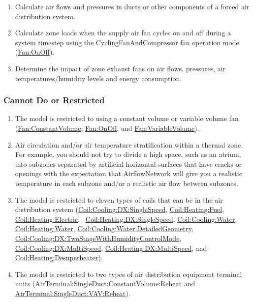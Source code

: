 \begin{enumerate}
\item Calculate air flows and pressures in ducts or other components of a forced air distribution system.
\item Calculate zone loads when the supply air fan cycles on and off during a system timestep using the CyclingFanAndCompressor fan operation mode (\hyperref[fanonoff]{Fan:OnOff}).
\item Determine the impact of zone exhaust fans on air flows, pressures, air temperatures/humidity levels and energy consumption.
\end{enumerate}

\subsubsection{Cannot Do or Restricted}\label{cannot-do-or-restricted}
\begin{enumerate}
\item The model is restricted to using a constant volume or variable volume fan (\hyperref[fanconstantvolume]{Fan:ConstantVolume}, \hyperref[fanonoff]{Fan:OnOff}, and \hyperref[fanvariablevolume]{Fan:VariableVolume}).
\item Air circulation and/or air temperature stratification within a thermal zone. For example, you should not try to divide a high space, such as an atrium, into subzones separated by artificial horizontal surfaces that have cracks or openings with the expectation that AirflowNetwork will give you a realistic temperature in each subzone and/or a realistic air flow between subzones.
\item The model is restricted to eleven types of coils that can be in the air distribution system (\hyperref[coilcoolingdxsinglespeed]{Coil:Cooling:DX:SingleSpeed}, \hyperref[coilheatinggas-000]{Coil:Heating:Fuel}, \hyperref[coilheatingelectric]{Coil:Heating:Electric},~ \hyperref[coilheatingdxsinglespeed]{Coil:Heating:DX:SingleSpeed}, \hyperref[coilcoolingwater]{Coil:Cooling:Water}, \hyperref[coilheatingwater]{Coil:Heating:Water}, \hyperref[coilcoolingwaterdetailedgeometry]{Coil:Cooling:Water:DetailedGeometry}, \hyperref[coilcoolingdxtwostagewithhumiditycontrolmode]{Coil:Cooling:DX:TwoStageWithHumidityControlMode}, \hyperref[coilcoolingdxmultispeed]{Coil:Cooling:DX:MultiSpeed}, \hyperref[coilheatingdxmultispeed]{Coil:Heating:DX:MultiSpeed}, and \hyperref[coilheatingdesuperheater]{Coil:Heating:Desuperheater}).
\item The model is restricted to two types of air distribution equipment terminal units (\hyperref[airterminalsingleductconstantvolumereheat]{AirTerminal:SingleDuct:ConstantVolume:Reheat} and \hyperref[airterminalsingleductvavreheat]{AirTerminal:SingleDuct:VAV:Reheat}).

\end{enumerate}
